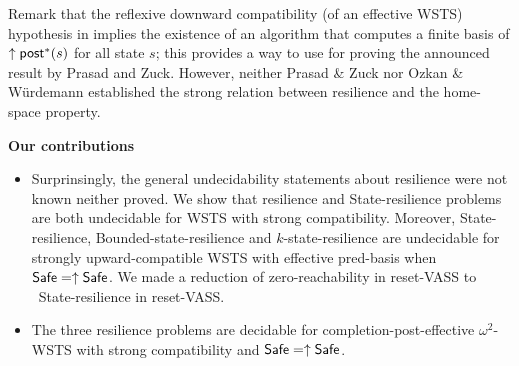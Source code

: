 Remark that the reflexive downward compatibility (of an effective WSTS) hypothesis in  \cite{DBLP:journals/corr/PrasadZ16} implies the existence of an algorithm that computes a finite basis of $\uparrow \textsf{post}^*(s)$ for all state $s$; this provides a way to use \cite{DBLP:journals/corr/abs-2108-00889} for proving the announced result by Prasad and Zuck.
However, neither Prasad \& Zuck nor Ozkan \& Würdemann established the strong relation between resilience and the home-space property.
%






\noindent
{\bf Our contributions}
\begin{itemize}

\item Surprinsingly, the general undecidability statements about resilience were not known neither proved. We show that resilience and { State-resilience} problems are both undecidable for WSTS with strong compatibility. 
Moreover, { State-resilience},
{ Bounded-state-resilience} and
{ $k$-state-resilience}
are undecidable for strongly upward-compatible WSTS with effective pred-basis
when
$\textsf{Safe}=\uparrow \textsf{Safe}$. We made a reduction of zero-reachability in reset-VASS to {\ State-resilience} in reset-VASS.


\item The three resilience problems are decidable for completion-post-effective $\omega^2$-WSTS with strong compatibility and $\textsf{Safe} = \uparrow \textsf{Safe}$.



\end{itemize}
